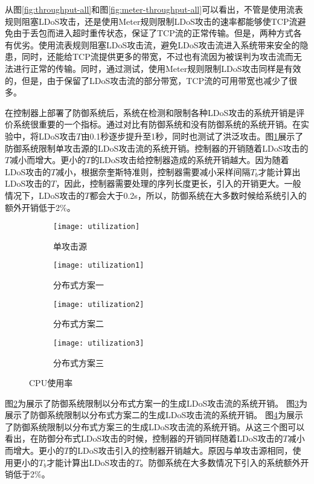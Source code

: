 从图\ref{fig:throughput-all}和图\ref{fig:meter-throughput-all}可以看出，不管是使用流表规则阻塞LDoS攻击，还是使用Meter规则限制LDoS攻击的速率都能够使TCP流避免由于丢包而进入超时重传状态，保证了TCP流的正常传输。但是，两种方式各有优劣。使用流表规则阻塞LDoS攻击流，避免LDoS攻击流进入系统带来安全的隐患，同时，还能给TCP流提供更多的带宽，不过也有流因为被误判为攻击流而无法进行正常的传输。同时，通过测试，使用Meter规则限制LDoS攻击同样是有效的，但是，由于保留了LDoS攻击流的部分带宽，TCP流的可用带宽也减少了很多。

在控制器上部署了防御系统后，系统在检测和限制各种LDoS攻击的系统开销是评价系统很重要的一个指标。通过对比有防御系统和没有防御系统的系统开销。在实验中，将LDoS攻击$T$由0.1秒逐步提升至1秒，同时也测试了洪泛攻击。图\ref{fig:CPU-single}展示了防御系统限制单攻击源的LDoS攻击流的系统开销。控制器的开销随着LDoS攻击的$T$减小而增大。更小的$T$的LDoS攻击给控制器造成的系统开销越大。因为随着LDoS攻击的$T$减小，根据奈奎斯特准则，控制器需要减小采样间隔$T_b$才能计算出LDoS攻击的$T$，因此，控制器需要处理的序列长度更长，引入的开销更大。一般情况下，LDoS攻击的$T$都会大于0.2s，所以，防御系统在大多数时候给系统引入的额外开销低于2\%。

\begin{figure}
    \begin{subfigure}{.49\textwidth}
        \centering
        \texttt{[image: utilization]}
        \caption{单攻击源}
        \label{fig:CPU-single}
    \end{subfigure}
    \begin{subfigure}{.49\textwidth}
        \centering
        \texttt{[image: utilization1]}
        \caption{分布式方案一}
        \label{fig:CPU-2h-mod1}
    \end{subfigure}

    \begin{subfigure}{.49\textwidth}
        \centering
        \texttt{[image: utilization2]}
        \caption{分布式方案二}
        \label{fig:CPU-2h-mod2}
    \end{subfigure}
    \begin{subfigure}{.49\textwidth}
        \centering
        \texttt{[image: utilization3]}
        \caption{分布式方案三}
        \label{fig:CPU-2h-mod3}
    \end{subfigure}


    \caption{CPU使用率}
    \label{fig:CPU-all}
\end{figure}

图\ref{fig:CPU-2h-mod1}为展示了防御系统限制以分布式方案一的生成LDoS攻击流的系统开销。
图\ref{fig:CPU-2h-mod2}为展示了防御系统限制以分布式方案二的生成LDoS攻击流的系统开销。
图\ref{fig:CPU-2h-mod3}为展示了防御系统限制以分布式方案三的生成LDoS攻击流的系统开销。从这三个图可以看出，在防御分布式LDoS攻击的时候，控制器的开销同样随着LDoS攻击的$T$减小而增大。更小的$T$的LDoS攻击引入的控制器开销越大。原因与单攻击源相同，使用更小的$T_b$才能计算出LDoS攻击的$T$。防御系统在大多数情况下引入的系统额外开销低于2\%。

